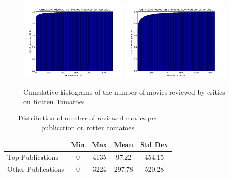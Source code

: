 \documentclass[12pt]{article}
\begin{document}
	\begin{figure}[H]
	    \centering
	    \includegraphics[width=0.48\textwidth]{plots/plot_r_crit_top.png}
	    \includegraphics[width=0.48\textwidth]{plots/plot_r_crit_oth.png}
	    \caption{Cumulative histograms of the number of movies reviewed by critics on Rotten Tomatoes}
	    \label{fig:r_crit}
	\end{figure}


	\begin{table}[H]
	 \centering
	 \caption{Distribution of number of reviewed movies per publication on rotten tomatoes} 
	 \begin{tabular}{ l | c | c | c | c }
	 \hline
	 &  Min & Max & Mean & Std Dev  \\
	 \hline
	 Top Publications & 0 & 4135 & 97.22 & 454.15 \\
	 Other Publications & 0 & 3224 & 297.78 & 520.28 \\
	 \hline
	 \end{tabular}
	 \end{table}
\end{document}
